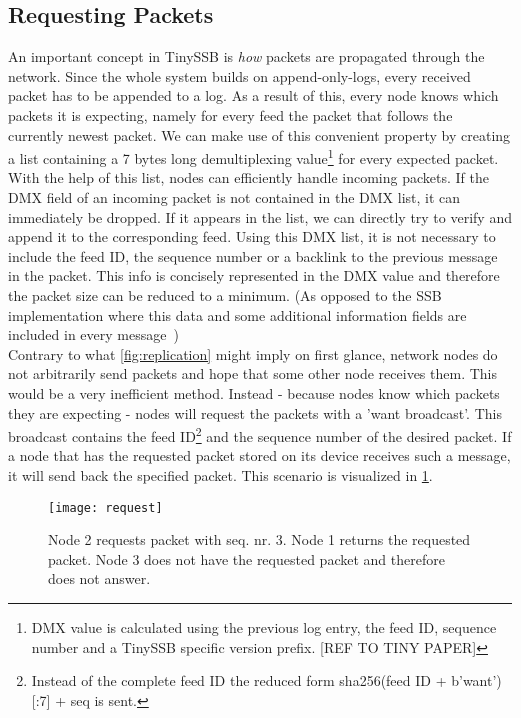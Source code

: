 \subsection{Requesting Packets}
An important concept in TinySSB is \textit{how} packets are propagated through the network. Since the whole system builds on append-only-logs, every received packet has to be appended to a log. As a result of this, every node knows which packets it is expecting, namely for every feed the packet that follows the currently newest packet. We can make use of this convenient property by creating a list containing a 7 bytes long demultiplexing value\footnote{DMX value is calculated using the previous log entry, the feed ID, sequence number and a TinySSB specific version prefix. [REF TO TINY PAPER]} for every expected packet. With the help of this list, nodes can efficiently handle incoming packets. If the DMX field of an incoming packet is not contained in the DMX list, it can immediately be dropped. If it appears in the list, we can directly try to verify and append it to the corresponding feed. Using this DMX list, it is not necessary to include the feed ID, the sequence number or a backlink to the previous message in the packet. This info is concisely represented in the DMX value and therefore the packet size can be reduced to a minimum. (As opposed to the SSB implementation where this data and some additional information fields are included in every message~\cite{10.1145/3357150.3357396}) \\
Contrary to what \cref{fig:replication} might imply on first glance, network nodes do not arbitrarily send packets and hope that some other node receives them. This would be a very inefficient method. Instead - because nodes know which packets they are expecting - nodes will request the packets with a 'want broadcast'. This broadcast contains the feed ID\footnote{Instead of the complete feed ID the reduced form sha256(feed ID + b'want')[:7] + seq is sent.} and the sequence number of the desired packet. If a node that has the requested packet stored on its device receives such a message, it will send back the specified packet. This scenario is visualized in \cref{fig:request}.

\begin{figure}
\centering
\texttt{[image: request]}
\caption{Node 2 requests packet with seq. nr. 3. Node 1 returns the requested packet. Node 3 does not have the requested packet and therefore does not answer.}
\label{fig:request}
\end{figure}

